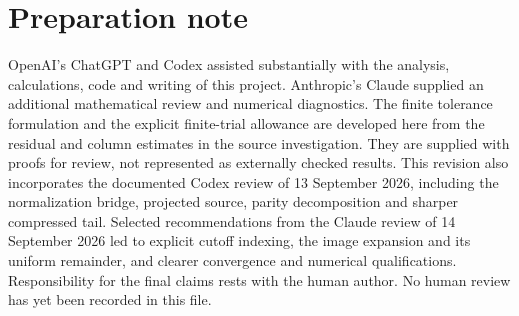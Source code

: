\section*{Preparation note}
OpenAI's ChatGPT and Codex assisted substantially with the analysis,
calculations, code and writing of this project. Anthropic's Claude supplied
an additional mathematical review and numerical diagnostics.
The finite tolerance formulation and the
explicit finite-trial allowance are developed here from the residual and
column estimates in the source investigation. They are supplied with proofs
for review, not represented as externally checked results. This revision
also incorporates the documented Codex review of 13 September 2026,
including the normalization bridge, projected source, parity decomposition
and sharper compressed tail. Selected recommendations from the Claude review
of 14 September 2026 led to explicit cutoff indexing, the image expansion
and its uniform remainder, and clearer convergence and numerical qualifications.
Responsibility for the final claims rests with the human author.
No human review has yet been recorded in this file.
\clearpage



